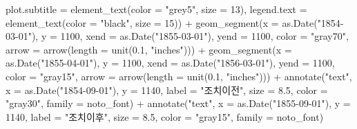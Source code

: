 \documentclass[
  letterpaper,
  chapter,a4paper,showtrims,openright,hidelinks]{oblivoir}
\newenvironment{Shaded}{\begin{snugshade}}{\end{snugshade}}
\newcommand{\AttributeTok}[1]{\textcolor[rgb]{0.40,0.45,0.13}{#1}}
\newcommand{\DecValTok}[1]{\textcolor[rgb]{0.68,0.00,0.00}{#1}}
\newcommand{\FloatTok}[1]{\textcolor[rgb]{0.68,0.00,0.00}{#1}}
\newcommand{\FunctionTok}[1]{\textcolor[rgb]{0.28,0.35,0.67}{#1}}
\newcommand{\NormalTok}[1]{\textcolor[rgb]{0.00,0.23,0.31}{#1}}
\newcommand{\SpecialCharTok}[1]{\textcolor[rgb]{0.37,0.37,0.37}{#1}}
\newcommand{\StringTok}[1]{\textcolor[rgb]{0.13,0.47,0.30}{#1}}
\begin{document}
\begin{Shaded}
\begin{Highlighting}[]
          \AttributeTok{plot.subtitle =} \FunctionTok{element\_text}\NormalTok{(}\AttributeTok{color =} \StringTok{"grey5"}\NormalTok{, }\AttributeTok{size =} \DecValTok{13}\NormalTok{),}
          \AttributeTok{legend.text =} \FunctionTok{element\_text}\NormalTok{(}\AttributeTok{color =} \StringTok{"black"}\NormalTok{, }\AttributeTok{size =} \DecValTok{15}\NormalTok{)) }\SpecialCharTok{+}
    \FunctionTok{geom\_segment}\NormalTok{(}\AttributeTok{x =} \FunctionTok{as.Date}\NormalTok{(}\StringTok{"1854{-}03{-}01"}\NormalTok{), }\AttributeTok{y =} \DecValTok{1100}\NormalTok{,}
                 \AttributeTok{xend =} \FunctionTok{as.Date}\NormalTok{(}\StringTok{"1855{-}03{-}01"}\NormalTok{), }\AttributeTok{yend =} \DecValTok{1100}\NormalTok{,}
                 \AttributeTok{color =} \StringTok{"gray70"}\NormalTok{,}
                 \AttributeTok{arrow =} \FunctionTok{arrow}\NormalTok{(}\AttributeTok{length =} \FunctionTok{unit}\NormalTok{(}\FloatTok{0.1}\NormalTok{, }\StringTok{"inches"}\NormalTok{))) }\SpecialCharTok{+}
    \FunctionTok{geom\_segment}\NormalTok{(}\AttributeTok{x =} \FunctionTok{as.Date}\NormalTok{(}\StringTok{"1855{-}04{-}01"}\NormalTok{), }\AttributeTok{y =} \DecValTok{1100}\NormalTok{,}
                 \AttributeTok{xend =} \FunctionTok{as.Date}\NormalTok{(}\StringTok{"1856{-}03{-}01"}\NormalTok{), }\AttributeTok{yend =} \DecValTok{1100}\NormalTok{,}
                 \AttributeTok{color =} \StringTok{"gray15"}\NormalTok{,}
                 \AttributeTok{arrow =} \FunctionTok{arrow}\NormalTok{(}\AttributeTok{length =} \FunctionTok{unit}\NormalTok{(}\FloatTok{0.1}\NormalTok{, }\StringTok{"inches"}\NormalTok{))) }\SpecialCharTok{+}
    \FunctionTok{annotate}\NormalTok{(}\StringTok{"text"}\NormalTok{, }\AttributeTok{x =} \FunctionTok{as.Date}\NormalTok{(}\StringTok{"1854{-}09{-}01"}\NormalTok{), }\AttributeTok{y =} \DecValTok{1140}\NormalTok{, }\AttributeTok{label =} \StringTok{"조치이전"}\NormalTok{,}
             \AttributeTok{size =} \FloatTok{8.5}\NormalTok{, }\AttributeTok{color =} \StringTok{"gray30"}\NormalTok{, }\AttributeTok{family =}\NormalTok{ noto\_font) }\SpecialCharTok{+}
    \FunctionTok{annotate}\NormalTok{(}\StringTok{"text"}\NormalTok{, }\AttributeTok{x =} \FunctionTok{as.Date}\NormalTok{(}\StringTok{"1855{-}09{-}01"}\NormalTok{), }\AttributeTok{y =} \DecValTok{1140}\NormalTok{, }\AttributeTok{label =} \StringTok{"조치이후"}\NormalTok{,}
             \AttributeTok{size =} \FloatTok{8.5}\NormalTok{, }\AttributeTok{color =} \StringTok{"gray15"}\NormalTok{, }\AttributeTok{family =}\NormalTok{ noto\_font) }
\end{Highlighting}
\end{Shaded}
\end{document}
